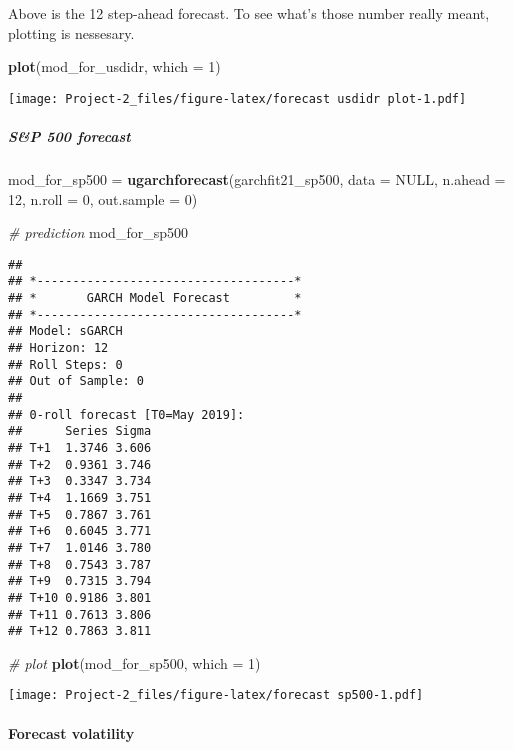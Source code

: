 \documentclass[]{article}
\newenvironment{Shaded}{\begin{snugshade}}{\end{snugshade}}
\newcommand{\KeywordTok}[1]{\textcolor[rgb]{0.13,0.29,0.53}{\textbf{#1}}}
\newcommand{\DataTypeTok}[1]{\textcolor[rgb]{0.13,0.29,0.53}{#1}}
\newcommand{\DecValTok}[1]{\textcolor[rgb]{0.00,0.00,0.81}{#1}}
\newcommand{\StringTok}[1]{\textcolor[rgb]{0.31,0.60,0.02}{#1}}
\newcommand{\CommentTok}[1]{\textcolor[rgb]{0.56,0.35,0.01}{\textit{#1}}}
\newcommand{\OtherTok}[1]{\textcolor[rgb]{0.56,0.35,0.01}{#1}}
\newcommand{\NormalTok}[1]{#1}
\let\oldparagraph\paragraph
\renewcommand{\paragraph}[1]{\oldparagraph{#1}\mbox{}}
\let\oldsubparagraph\subparagraph
\renewcommand{\subparagraph}[1]{\oldsubparagraph{#1}\mbox{}}
\begin{document}
Above is the 12 step-ahead forecast. To see what's those number really
meant, plotting is nessesary.

\begin{Shaded}
\begin{Highlighting}[]
\KeywordTok{plot}\NormalTok{(mod_for_usdidr, }\DataTypeTok{which =} \DecValTok{1}\NormalTok{)}
\end{Highlighting}
\end{Shaded}

\texttt{[image: Project-2\_files/figure-latex/forecast usdidr plot-1.pdf]}

\subparagraph{S\&P 500 forecast}\label{sp-500-forecast}

\begin{Shaded}
\begin{Highlighting}[]
\NormalTok{mod_for_sp500 =}\StringTok{ }\KeywordTok{ugarchforecast}\NormalTok{(garchfit21_sp500, }\DataTypeTok{data =} \OtherTok{NULL}\NormalTok{, }\DataTypeTok{n.ahead =} \DecValTok{12}\NormalTok{, }\DataTypeTok{n.roll =} \DecValTok{0}\NormalTok{, }\DataTypeTok{out.sample =} \DecValTok{0}\NormalTok{)}

\CommentTok{# prediction}
\NormalTok{mod_for_sp500}
\end{Highlighting}
\end{Shaded}

\begin{verbatim}
## 
## *------------------------------------*
## *       GARCH Model Forecast         *
## *------------------------------------*
## Model: sGARCH
## Horizon: 12
## Roll Steps: 0
## Out of Sample: 0
## 
## 0-roll forecast [T0=May 2019]:
##      Series Sigma
## T+1  1.3746 3.606
## T+2  0.9361 3.746
## T+3  0.3347 3.734
## T+4  1.1669 3.751
## T+5  0.7867 3.761
## T+6  0.6045 3.771
## T+7  1.0146 3.780
## T+8  0.7543 3.787
## T+9  0.7315 3.794
## T+10 0.9186 3.801
## T+11 0.7613 3.806
## T+12 0.7863 3.811
\end{verbatim}

\begin{Shaded}
\begin{Highlighting}[]
\CommentTok{# plot}
\KeywordTok{plot}\NormalTok{(mod_for_sp500, }\DataTypeTok{which =} \DecValTok{1}\NormalTok{)}
\end{Highlighting}
\end{Shaded}

\texttt{[image: Project-2\_files/figure-latex/forecast sp500-1.pdf]}

\paragraph{Forecast volatility}\label{forecast-volatility}
\end{document}
